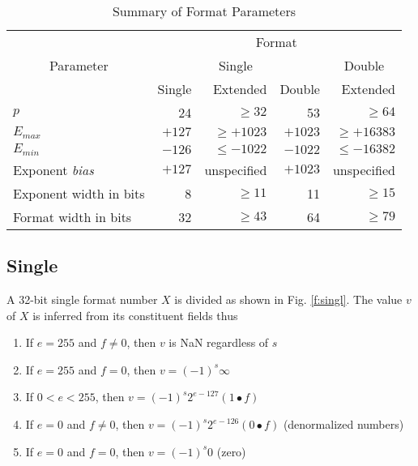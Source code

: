 \documentclass[11pt,makeidx]{book}     %
\begin{document}
\begin{table}[htpb]
\begin{center}
\begin{tabular}{lrrrr} \\
\hline\hline

     &\multicolumn{4}{c}{Format} \\
\cline{2-5}
\multicolumn{1}{c}{Parameter} &    &\multicolumn{1}{c}{Single} &
                                   & \multicolumn{1}{c}{Double} \\
                     & Single & Extended     & Double & Extended     \\ 
\hline
$p$                 &     24 &    $\geq 32$ &     53  &     $\geq 64$ \\ 
$E_{max}$           & $+127$ & $\geq +1023$ & $+1023$ & $\geq +16383$ \\
$E_{min}$           & $-126$ & $\leq -1022$ & $-1022$ & $\leq -16382$ \\
Exponent {\it bias} & $+127$ &  unspecified & $+1023$ &   unspecified \\
Exponent width in bits &   8 &    $\geq 11$ &      11 &     $\geq 15$ \\
Format width in bits &    32 &    $\geq 43$ &      64 &     $\geq 79$ \\
\hline
     
\end{tabular}
\end{center}                 
\caption[Summary of Format Parameters]{Summary of Format Parameters}
\label{t:FormParm}
\end{table}
                                                      
\subsection{Single}

A 32-bit single format number $X$ is divided as shown in Fig.
\ref{f:singl}.  The value $v$ of $X$ is inferred from its constituent
fields thus
\begin{enumerate}
 \item If $e = 255$ and $f \neq 0$, then $v$ is NaN regardless of $s$ 
 \item If $e = 255$ and $f = 0$, then $v = (-1)^{s} \infty$
 \item If $0 < e < 255$, then $v = (-1)^{s} 2^{e-127} (1 \bullet f)$
 \item If $e = 0$ and $f \neq 0$, then $v = (-1)^{s} 2^{e-126} (0 \bullet f)$
      (denormalized numbers)
\item If $e = 0$ and $f = 0$, then $v = (-1)^{s}0$ (zero)
\end{enumerate}
\end{document}
